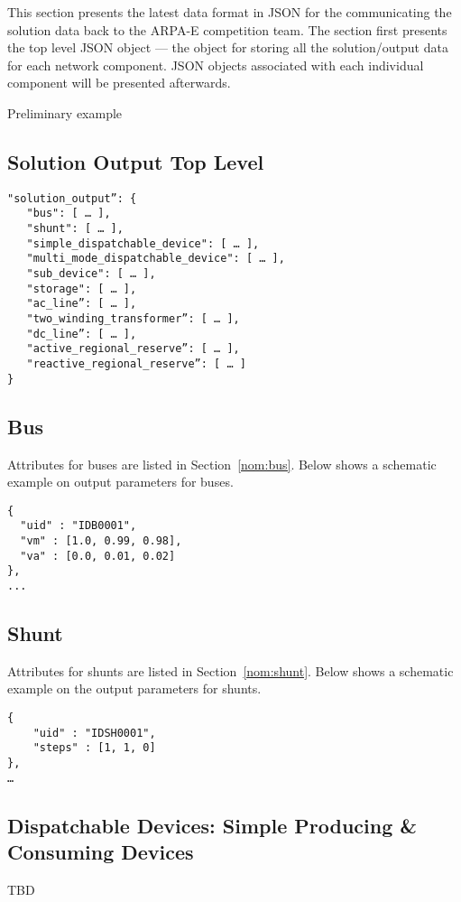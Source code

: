 \label{sec:solution_format}
This section presents the latest data format in JSON for the 
communicating the solution data back to the ARPA-E competition team.
The section first presents the top level JSON object --- the
object for storing all the solution/output data 
for each network component.
JSON objects associated with each individual component will be presented afterwards.

\begin{todo}[]{}
Preliminary example
\end{todo}

\subsection{Solution Output Top Level}
\label{sec:output_data}

\begin{verbatim}
"solution_output”: {
   "bus": [ … ],
   "shunt": [ … ],
   "simple_dispatchable_device": [ … ],
   "multi_mode_dispatchable_device": [ … ],
   "sub_device": [ … ],
   "storage": [ … ],
   "ac_line”: [ … ],
   "two_winding_transformer”: [ … ],
   "dc_line”: [ … ],   
   "active_regional_reserve”: [ … ],
   "reactive_regional_reserve”: [ … ]
}    
\end{verbatim}

\subsection{Bus}
Attributes for buses are listed in Section~\ref{nom:bus}.
Below shows a schematic example on output parameters for buses.
\begin{verbatim}
{
  "uid" : "IDB0001",
  "vm" : [1.0, 0.99, 0.98],
  "va" : [0.0, 0.01, 0.02]
},
...
\end{verbatim}

\subsection{Shunt}
Attributes for shunts are listed in Section~\ref{nom:shunt}.
Below shows a schematic example on the output parameters for shunts.
\begin{verbatim}
{
    "uid" : "IDSH0001",
    "steps" : [1, 1, 0]
},
…    
\end{verbatim}

\subsection{Dispatchable Devices: Simple Producing \& Consuming Devices}
\begin{todo}[]{}
TBD
\end{todo}

